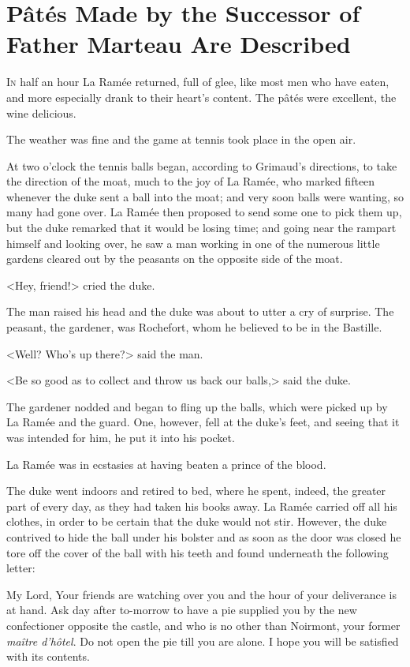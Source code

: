 \chapter{Pâtés Made by the Successor of Father Marteau Are Described}

 \lettrine{I}{n} half an hour La Ramée returned, full of glee, like most men who have eaten, and more especially drank to their heart's content. The pâtés were excellent, the wine delicious.

\zz
The weather was fine and the game at tennis took place in the open air.

At two o'clock the tennis balls began, according to Grimaud's directions, to take the direction of the moat, much to the joy of La Ramée, who marked fifteen whenever the duke sent a ball into the moat; and very soon balls were wanting, so many had gone over. La Ramée then proposed to send some one to pick them up, but the duke remarked that it would be losing time; and going near the rampart himself and looking over, he saw a man working in one of the numerous little gardens cleared out by the peasants on the opposite side of the moat.

<Hey, friend!> cried the duke.

The man raised his head and the duke was about to utter a cry of surprise. The peasant, the gardener, was Rochefort, whom he believed to be in the Bastille.

<Well? Who's up there?> said the man.

<Be so good as to collect and throw us back our balls,> said the duke.

The gardener nodded and began to fling up the balls, which were picked up by La Ramée and the guard. One, however, fell at the duke's feet, and seeing that it was intended for him, he put it into his pocket.

La Ramée was in ecstasies at having beaten a prince of the blood.

The duke went indoors and retired to bed, where he spent, indeed, the greater part of every day, as they had taken his books away. La Ramée carried off all his clothes, in order to be certain that the duke would not stir. However, the duke contrived to hide the ball under his bolster and as soon as the door was closed he tore off the cover of the ball with his teeth and found underneath the following letter: 

\begin{mail}{}{My Lord,}
Your friends are watching over you and the hour of your deliverance is at hand. Ask day after to-morrow to have a pie supplied you by the new confectioner opposite the castle, and who is no other than Noirmont, your former \textit{maître d'hôtel}. Do not open the pie till you are alone. I hope you will be satisfied with its contents.  

\end{mail}

